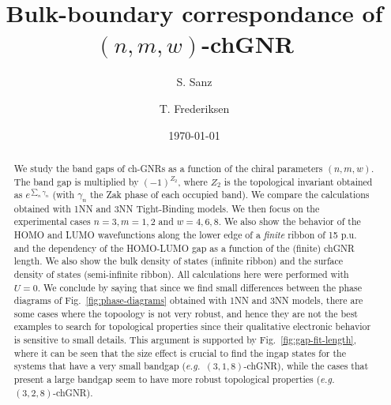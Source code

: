 \documentclass[amsmath,%
amssymb,prb,superscriptaddress]{revtex4}
\newcommand{\Figref}[1]{Fig.~\ref{#1}}
\newcommand{\eg}[1]{\textit{e.g.}}
\begin{document}
\title{Bulk-boundary correspondance of $(n,m,w)$-chGNR}

\author{S. Sanz}

\author{T. Frederiksen}

\date{\today}

\begin{abstract}
We study the band gaps of ch-GNRs as a function of the chiral parameters $(n,m,w)$. The band gap is multiplied by $(-1)^{Z_{2}}$, where $Z_{2}$ is the topological invariant obtained as $e^{\sum_{n}\gamma_{n}}$ (with $\gamma_{n}$ the Zak phase of each occupied band). We compare the calculations obtained with 1NN and 3NN Tight-Binding models. %
We then focus on the experimental cases $n=3, m=1, 2$ and $w=4,6,8$. We also show the behavior of the HOMO and LUMO wavefunctions along the lower edge of a \emph{finite} ribbon of 15 p.u. and the dependency of the HOMO-LUMO gap as a function of the (finite) chGNR length. We also show the bulk density of states (infinite ribbon) and the surface density of states (semi-infinite ribbon). All calculations here were performed with $U=0$. We conclude by saying that since we find small differences between the phase diagrams of \Figref{fig:phase-diagrams} obtained with 1NN and 3NN models, there are some cases where the topoology is not very robust, and hence they are not the best examples to search for topological properties since their qualitative electronic behavior is sensitive to small details. This argument is supported by \Figref{fig:gap-fit-length}, where it can be seen that the size effect is crucial to find the ingap states for the systems that have a very small bandgap (\eg \ \ $(3,1,8)$-chGNR), while the cases that present a large bandgap seem to have more robust topological properties (\eg \ \ $(3,2,8)$-chGNR).
\end{abstract}


\maketitle

%
%
\end{document}
